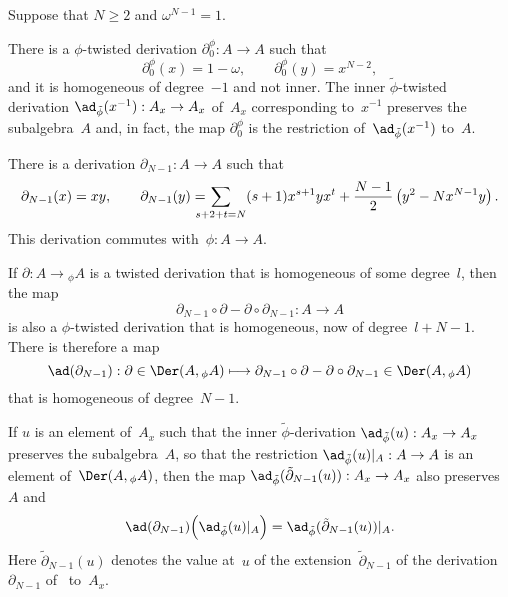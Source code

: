 \begin{Proposition}\label{prop:nin}
Suppose that $N\geq2$ and $\omega^{N-1}=1$.
\begin{thmlist}

\item There is a $\phi$-twisted derivation $\partial_0^\phi:A\to A$ such
that
  \[
  \partial_0^\phi(x) = 1-\omega, 
  \qquad
  \partial_0^\phi(y) = x^{N-2},
  \]
and it is homogeneous of degree~$-1$ and not inner. The inner
$\tilde\phi$-twisted derivation $\ad_{\tilde\phi}(x^{-1}):A_x\to A_x$
of~$A_x$ corresponding to~$x^{-1}$ preserves the subalgebra~$A$ and, in
fact, the map $\partial_0^\phi$ is the restriction
of~$\ad_{\tilde\phi}(x^{-1})$ to~$A$.

\item There is a derivation $\partial_{N-1}:A\to A$ such that
  \[
  \partial_{N-1}(x) = xy, 
  \qquad
  \partial_{N-1}(y) 
    = \hskip-1em\sum_{s+2+t=N}(s+1)x^{s+1}yx^t 
         +  \frac{N-1}{2}
            \left(
              y^{2}
              -N
              x^{N-1}y
            \right).
  \]
This derivation commutes with~$\phi:A\to A$.

\item If $\partial:A\to{}_\phi A$ is a twisted derivation that is
homogeneous of some degree~$l$, then the map
  \[
  \partial_{N-1}\circ\partial-\partial\circ\partial_{N-1}:A\to A
  \]
is also a $\phi$-twisted derivation that is homogeneous, now of
degree~$l+N-1$. There is therefore a map  
  \[
  \ad(\partial_{N-1}):
        \partial
        \in\Der(A,{}_\phi A)
        \longmapsto
        \partial_{N-1}\circ\partial-\partial\circ\partial_{N-1}
        \in\Der(A,{}_\phi A)
  \]
that is homogeneous of degree~$N-1$.

\item If $u$ is an element of~$A_x$ such that the inner
$\tilde\phi$-derivation $\ad_{\tilde\phi}(u):A_x\to A_x$ preserves the
subalgebra~$A$, so that the restriction
$\ad_{\tilde\phi}(u)|_A:A\to A$ is an element of~$\Der(A,{}_\phi A)$, then
the map $\ad_{\tilde\phi}(\tilde\partial_{N-1}(u)):A_x\to A_x$ also
preserves~$A$ and
  \[ \label{eq:adad}
  \ad(\partial_{N-1})\Bigl(\ad_{\tilde\phi}(u)|_A\Bigr)
        = \ad_{\tilde\phi}(\tilde\partial_{N-1}(u))|_A.
  \]
Here $\tilde\partial_{N-1}(u)$ denotes the value at~$u$ of the
extension~$\tilde\partial_{N-1}$ of the derivation~$\partial_{N-1}$
of~ to~$A_x$.

\end{thmlist}
\end{Proposition}

